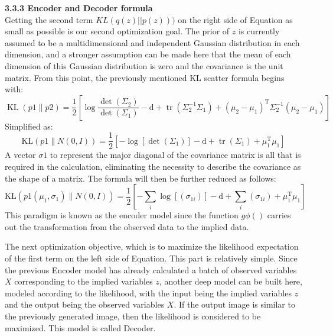 \documentclass[
]{article}
\begin{document}
{\bfseries \small 3.3.3 Encoder and Decoder formula} \\
Getting the second term \(KL(q(z)||p(z)))\) on the right side of
Equation as small as possible is our second optimization goal. The prior
of \(z\) is currently assumed to be a multidimensional and independent
Gaussian distribution in each dimension, and a stronger assumption can
be made here that the mean of each dimension of this Gaussian
distribution is zero and the covariance is the unit matrix. From this
point, the previously mentioned KL scatter formula begins with:
$$
\operatorname{KL}(p 1 \| p 2)=\frac{1}{2}\left[\log \frac{\operatorname{det}\left(\Sigma_2\right)}{\operatorname{det}\left(\Sigma_1\right)}-\mathrm{d}+\operatorname{tr}\left(\Sigma_2^{-1} \Sigma_1\right)+\left(\mu_2-\mu_1\right)^{\mathrm{T}} \Sigma_2^{-1}\left(\mu_2-\mu_1\right)\right]
$$
Simplified as:
$$
\mathrm{KL}(p 1 \| N(0, I))=\frac{1}{2}\left[-\log \left[\operatorname{det}\left(\Sigma_1\right)\right]-\mathrm{d}+\operatorname{tr}\left(\Sigma_1\right)+\mu_1^{\mathrm{T}} \mu_1\right]
$$
A vector \(σ1\) to represent the major diagonal of the covariance matrix
is all that is required in the calculation, eliminating the necessity to
describe the covariance as the shape of a matrix. The formula will then
be further reduced as follows:
$$
\mathrm{KL}\left(p 1\left(\mu_1, \sigma_1\right) \| N(0, I)\right)=\frac{1}{2}\left[-\sum_i \log \left[\left(\sigma_{1 i}\right)\right]-\mathrm{d}+\sum_i\left(\sigma_{1 i}\right)+\mu_1^{\mathrm{T}} \mu_1\right]
$$
This paradigm is known as the encoder model since the function \(gϕ()\)
carries out the transformation from the observed data to the implied
data.

The next optimization objective, which is to maximize the likelihood
expectation of the first term on the left side of Equation. This part is
relatively simple. Since the previous Encoder model has already
calculated a batch of observed variables \(X\) corresponding to the
implied variables \(z\), another deep model can be built here, modeled
according to the likelihood, with the input being the implied variables
\(z\) and the output being the observed variables \(X\). If the output
image is similar to the previously generated image, then the likelihood
is considered to be maximized. This model is called Decoder.
\end{document}
